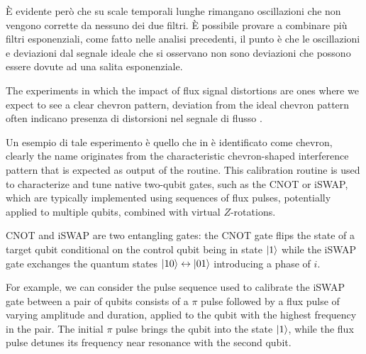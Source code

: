 È evidente però che su scale temporali lunghe rimangano oscillazioni che non vengono corrette da nessuno dei due filtri.
È possibile provare a combinare più filtri esponenziali, come fatto nelle analisi precedenti, il punto è che le oscillazioni e deviazioni dal segnale ideale che si osservano non sono deviazioni che possono essere dovute ad una salita esponenziale.

The experiments in which the impact of flux signal distortions are ones where we expect to see a clear chevron pattern, deviation from the ideal chevron pattern often indicano presenza di distorsioni nel segnale di flusso \cite{Langford2017}.

Un esempio di tale esperimento è quello che in \Qibocal è identificato come chevron, clearly the name originates from the characteristic chevron-shaped interference pattern that is expected as output of the routine.
This calibration routine is used to characterize and tune native two-qubit gates, such as the CNOT or iSWAP, which are typically implemented using sequences of flux pulses, potentially applied to multiple qubits, combined with virtual $Z$-rotations.

CNOT and iSWAP are two entangling gates: the CNOT gate flips the state of a target qubit conditional on the control qubit being in state $\ket{1}$ while the iSWAP gate exchanges the quantum states $\ket{10}\leftrightarrow\ket{01}$ introducing a phase of $i$.

For example, we can consider the pulse sequence used to calibrate the iSWAP gate between a pair of qubits consists of a $\pi$ pulse followed by a flux pulse of varying amplitude and duration, applied to the qubit with the highest frequency in the pair. 
The initial $\pi$ pulse brings the qubit into the state $\ket{1}$, while the flux pulse detunes its frequency near resonance with the second qubit. 

